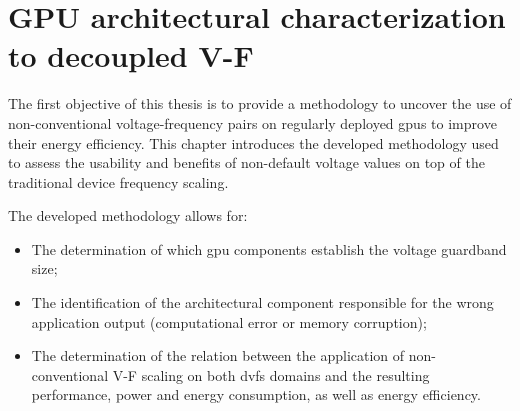 
\chapter{GPU architectural characterization to decoupled V-F}
\label{chapter:gpu_char}
The first objective of this thesis is to provide a methodology to uncover the use of non-conventional voltage-frequency pairs on regularly deployed \acrshort{gpu}s to improve their energy efficiency.
This chapter introduces the developed methodology used to assess the usability and benefits of non-default voltage values on top of the traditional device frequency scaling. 

The developed methodology allows for:
\begin{itemize}
    \item The determination of which \acrshort{gpu} components establish the voltage guardband size;
    \item The identification of the architectural component responsible for the wrong application output (computational error or memory corruption);
    \item The determination of the relation between the application of non-conventional V-F scaling on both \acrshort{dvfs} domains and the resulting performance, power and energy consumption, as well as energy efficiency.
\end{itemize}

